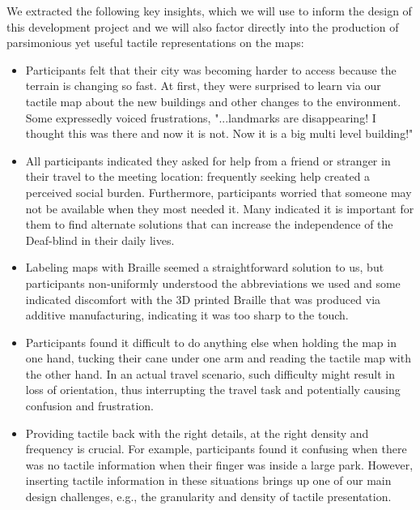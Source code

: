 We extracted the following key insights, which we will use to inform the design of this development project and we will also factor directly into the production of parsimonious yet useful tactile representations on the maps:

\begin{itemize}
  \item Participants felt that their city was becoming harder to access because the terrain is changing so fast. At first, they were surprised to learn via our tactile map about the new buildings and other changes to the environment. Some expressedly voiced frustrations, "...landmarks are disappearing! I thought this was there and now it is not. Now it is a big multi level building!" 

  \item All participants indicated they asked for help from a friend or stranger in their travel to the meeting location: frequently seeking help created a perceived social burden. Furthermore, participants worried that someone may not be available when they most needed it. Many indicated it is important for them to find alternate solutions that can increase the independence of the Deaf-blind in their daily lives.

  \item Labeling maps with Braille seemed a straightforward solution to us, but participants non-uniformly understood the abbreviations we used and some indicated discomfort with the 3D printed Braille that was produced via additive manufacturing, indicating it was too sharp to the touch.

  \item Participants found it difficult to do anything else when holding the map in one hand, tucking their cane under one arm and reading the tactile map with the other hand. In an actual travel scenario, such
difficulty might result in loss of orientation, thus interrupting
the travel task and potentially causing confusion and frustration.

  \item Providing tactile back with the right details, at the right density and frequency is crucial. For example, participants found it confusing when there was no tactile information when their finger was inside a large park. However, inserting tactile information in these situations brings up one of our main design challenges, e.g., the granularity and density of tactile presentation.
\end{itemize}

